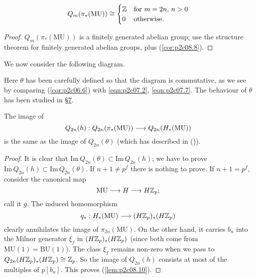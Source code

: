 \documentclass[../main]{subfiles}
\begin{document}
\begin{corollary}
\label{cor:p2c08.9}
$$Q_m(\pi_\ast(\mathrm{MU})) \cong \begin{cases}\mathbb{Z} & \text {for } m = 2n, \, n > 0 \\ 0 & \text{otherwise.}\end{cases}$$
\end{corollary}

\begin{proof}
$Q_m(\pi_\ast(\mathrm{MU}))$ is a finitely generated abelian group; use the structure theorem for finitely generated abelian groups, plus (\ref{cor:p2c08.8}).
\end{proof}

We now consider the following diagram. 

\begin{center}
\end{center}

Here $\theta$ has been carefully defined so that the diagram is commutative, as we see by comparing (\ref{cor:p2c06.6}) with \eqref{eqn:p2c07.2}, \eqref{eqn:p2c07.7}. The behaviour of $\theta$ has been studied in \hyperref[sec:p2c7]{\S 7}. 

\begin{lemma}
\label{lem:p2c08.10}
The image of $$Q_{2n}(h) : Q_{2n}(\pi_\ast(\mathrm{MU})) \overset{}{\longrightarrow} Q_{2n}(H_\ast(\mathrm{MU}))$$ is the same as the image of $Q_{2n}(\theta)$ (which has described in (\cite{lem:p2c07.9})). 
\end{lemma}

\begin{proof}
It is clear that $\mathrm{Im} \, Q_{2n}(\theta) \subset \mathrm{Im} \, Q_{2n}(h)$; we have to prove $\mathrm{Im} \, Q_{2n}(h) \subset \mathrm{Im} \, Q_{2n}(\theta)$. If $n + 1 \ne p^f$ there is nothing to prove. If $n + 1 = p^f$, consider the canonical map $$\mathrm{MU} \overset{}{\longrightarrow} H \overset{}{\longrightarrow} H \mathbb{Z}_p;$$ call it $g$. The induced homomorphism $$q_\ast : H_\ast(\mathrm{MU}) \overset{}{\longrightarrow} (H \mathbb{Z}_p)_\ast (H \mathbb{Z}_p)$$ clearly annihilates the image of $\pi_{2n}(\mathrm{MU})$. On the other hand, it carries $b_n$ into the Milnor generator $\xi_f$ in $(H \mathbb{Z}_p)_\ast (H \mathbb{Z}_p)$ (since both come from $\mathrm{MU}(1) = \mathrm{BU}(1)$). The class $\xi_f$ remains non-zero when we pass to $Q_{2n}(H \mathbb{Z}_p)_\ast (H \mathbb{Z}_p) \cong \mathbb{Z}_p$. So the image of $Q_{2n}(h)$ consists at most of the multiples of $p[b_n]$. This proves (\ref{lem:p2c08.10}).
\end{proof}
\end{document}
